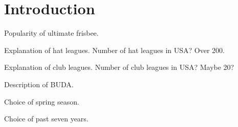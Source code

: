 \section{Introduction}

Popularity of ultimate frisbee.

Explanation of hat leagues. Number of hat leagues in USA? Over 200.

Explanation of club leagues. Number of club leagues in USA? Maybe 20?

Description of BUDA.

Choice of spring season.

Choice of past seven years.